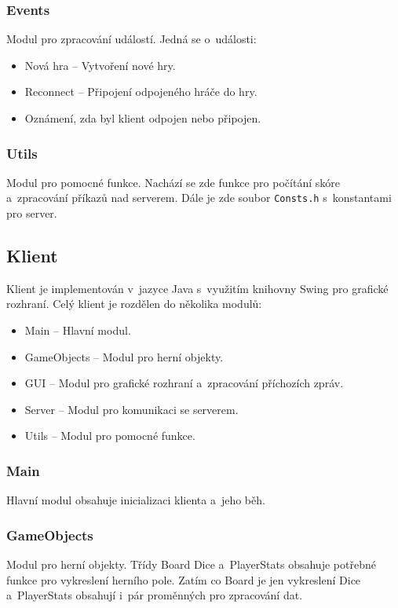 \documentclass[12pt, a4paper]{article}
\begin{document}
\subsubsection{Events}
Modul pro zpracování událostí.
Jedná se o~události:
\begin{itemize}
    \item Nová hra -- Vytvoření nové hry.
    \item Reconnect -- Připojení odpojeného hráče do hry.
    \item Oznámení, zda byl klient odpojen nebo připojen.
\end{itemize}

\subsubsection{Utils}
Modul pro pomocné funkce.
Nachází se zde funkce pro počítání skóre a~zpracování příkazů nad serverem.
Dále je zde soubor \texttt{Consts.h} s~konstantami pro server.

\newpage
\subsection{Klient}
Klient je implementován v~jazyce Java s~využitím knihovny Swing pro grafické rozhraní.
Celý klient je rozdělen do několika modulů:
\begin{itemize}
    \item Main -- Hlavní modul.
    \item GameObjects -- Modul pro herní objekty.
    \item GUI -- Modul pro grafické rozhraní a~zpracování příchozích zpráv.
    \item Server -- Modul pro komunikaci se serverem.
    \item Utils -- Modul pro pomocné funkce.
\end{itemize}

\subsubsection{Main}
Hlavní modul obsahuje inicializaci klienta a~jeho běh.

\subsubsection{GameObjects}
Modul pro herní objekty.
Třídy Board Dice a~PlayerStats obsahuje potřebné funkce pro vykreslení herního pole.
Zatím co Board je jen vykreslení Dice a~PlayerStats obsahují i~pár proměnných pro zpracování dat.
\end{document}
